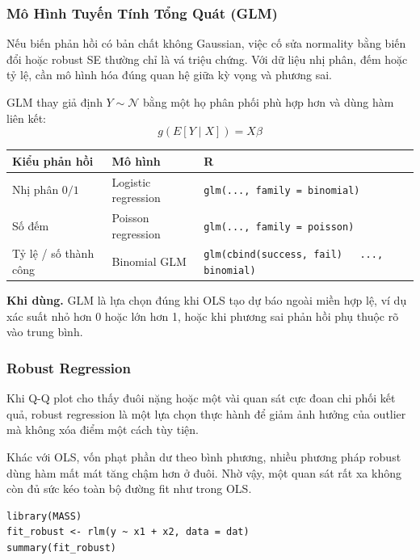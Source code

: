 \subsubsection{Mô Hình Tuyến Tính Tổng Quát (GLM)}

Nếu biến phản hồi có bản chất không Gaussian, việc cố sửa normality bằng biến đổi hoặc robust SE thường chỉ là vá triệu chứng. Với dữ liệu nhị phân, đếm hoặc tỷ lệ, cần mô hình hóa đúng quan hệ giữa kỳ vọng và phương sai.

GLM thay giả định $Y \sim \mathcal{N}$ bằng một họ phân phối phù hợp hơn và dùng hàm liên kết:
\[
  g(E[Y\mid X]) = X\beta
\]

\begin{center}
\small
\begin{tabularx}{\textwidth}{@{}>{\raggedright\arraybackslash}p{3.0cm}>{\raggedright\arraybackslash}p{3.2cm}>{\raggedright\arraybackslash}X@{}}
\toprule
\textbf{Kiểu phản hồi} & \textbf{Mô hình} & \textbf{R} \\
\midrule
Nhị phân $0/1$ & Logistic regression & \texttt{glm(..., family = binomial)} \\
Số đếm & Poisson regression & \texttt{glm(..., family = poisson)} \\
Tỷ lệ / số thành công & Binomial GLM & \texttt{glm(cbind(success, fail) ~ ..., binomial)} \\
\bottomrule
\end{tabularx}
\end{center}

\textbf{Khi dùng.} GLM là lựa chọn đúng khi OLS tạo dự báo ngoài miền hợp lệ, ví dụ xác suất nhỏ hơn 0 hoặc lớn hơn 1, hoặc khi phương sai phản hồi phụ thuộc rõ vào trung bình.

\subsubsection{Robust Regression}

Khi Q-Q plot cho thấy đuôi nặng hoặc một vài quan sát cực đoan chi phối kết quả, robust regression là một lựa chọn thực hành để giảm ảnh hưởng của outlier mà không xóa điểm một cách tùy tiện.

Khác với OLS, vốn phạt phần dư theo bình phương, nhiều phương pháp robust dùng hàm mất mát tăng chậm hơn ở đuôi. Nhờ vậy, một quan sát rất xa không còn đủ sức kéo toàn bộ đường fit như trong OLS.

\begin{lstlisting}[style=Rstyle]
library(MASS)
fit_robust <- rlm(y ~ x1 + x2, data = dat)
summary(fit_robust)
\end{lstlisting}

